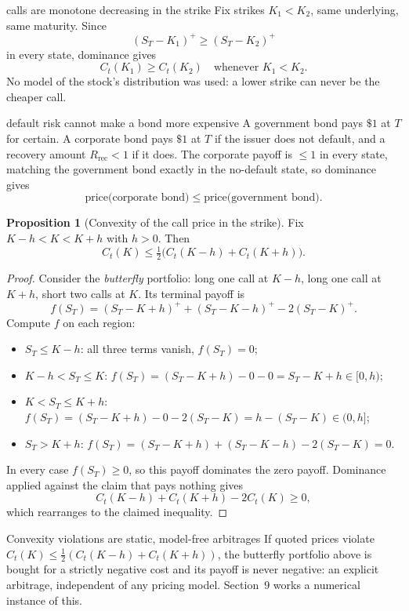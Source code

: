 \documentclass[10pt]{article}
\newcommand{\1}{\mathbf 1}
\theoremstyle{definition}
\newtheorem{proposition}[definition]{Proposition}
\begin{document}
\begin{boardexample}{calls are monotone decreasing in the strike}
Fix strikes \(K_1<K_2\), same underlying, same maturity. Since
\[
(S_T-K_1)^+\geq(S_T-K_2)^+
\]
in every state, dominance gives
\[
\boxed{C_t(K_1)\geq C_t(K_2)\quad\text{whenever }K_1<K_2.}
\]
No model of the stock's distribution was used: a lower strike can never be
the cheaper call.
\end{boardexample}

\begin{boardexample}{default risk cannot make a bond more expensive}
A government bond pays \(\$1\) at \(T\) for certain. A corporate bond pays
\(\$1\) at \(T\) if the issuer does not default, and a recovery amount
\(R_{\mathrm{rec}}<1\) if it does. The corporate payoff is \(\leq1\) in every
state, matching the government bond exactly in the no-default state, so
dominance gives
\[
\boxed{\text{price(corporate bond)}\leq\text{price(government bond)}.}
\]
\end{boardexample}

\begin{proposition}[Convexity of the call price in the strike]
Fix \(K-h<K<K+h\) with \(h>0\). Then
\[
\boxed{C_t(K)\leq\tfrac12\bigl(C_t(K-h)+C_t(K+h)\bigr).}
\]
\end{proposition}

\begin{proof}
Consider the \emph{butterfly} portfolio: long one call at \(K-h\), long one
call at \(K+h\), short two calls at \(K\). Its terminal payoff is
\[
f(S_T)=(S_T-K+h)^++(S_T-K-h)^+-2(S_T-K)^+.
\]
Compute \(f\) on each region:
\begin{itemize}
  \item \(S_T\leq K-h\): all three terms vanish, \(f(S_T)=0\);
  \item \(K-h<S_T\leq K\): \(f(S_T)=(S_T-K+h)-0-0=S_T-K+h\in[0,h)\);
  \item \(K<S_T\leq K+h\): \(f(S_T)=(S_T-K+h)-0-2(S_T-K)=h-(S_T-K)\in(0,h]\);
  \item \(S_T>K+h\): \(f(S_T)=(S_T-K+h)+(S_T-K-h)-2(S_T-K)=0\).
\end{itemize}
In every case \(f(S_T)\geq0\), so this payoff dominates the zero payoff.
Dominance applied against the claim that pays nothing gives
\[
C_t(K-h)+C_t(K+h)-2C_t(K)\geq0,
\]
which rearranges to the claimed inequality.
\end{proof}

\begin{warningbox}{Convexity violations are static, model-free arbitrages}
If quoted prices violate \(C_t(K)\leq\tfrac12(C_t(K-h)+C_t(K+h))\), the
butterfly portfolio above is bought for a strictly negative cost and its
payoff is never negative: an explicit arbitrage, independent of any pricing
model. Section~9 works a numerical instance of this.
\end{warningbox}
\end{document}
